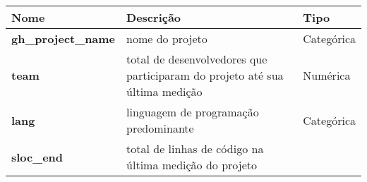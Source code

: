 \documentclass[]{article}
\begin{document}
\begin{longtable}[]{@{}lll@{}}
\toprule
\begin{minipage}[b]{0.21\columnwidth}\raggedright\strut
Nome\strut
\end{minipage} & \begin{minipage}[b]{0.61\columnwidth}\raggedright\strut
Descrição\strut
\end{minipage} & \begin{minipage}[b]{0.10\columnwidth}\raggedright\strut
Tipo\strut
\end{minipage}\tabularnewline
\midrule
\endhead
\begin{minipage}[t]{0.21\columnwidth}\raggedright\strut
\textbf{gh\_project\_name}\strut
\end{minipage} & \begin{minipage}[t]{0.61\columnwidth}\raggedright\strut
nome do projeto\strut
\end{minipage} & \begin{minipage}[t]{0.10\columnwidth}\raggedright\strut
Categórica\strut
\end{minipage}\tabularnewline
\begin{minipage}[t]{0.21\columnwidth}\raggedright\strut
\textbf{team}\strut
\end{minipage} & \begin{minipage}[t]{0.61\columnwidth}\raggedright\strut
total de desenvolvedores que participaram do projeto até sua última
medição\strut
\end{minipage} & \begin{minipage}[t]{0.10\columnwidth}\raggedright\strut
Numérica\strut
\end{minipage}\tabularnewline
\begin{minipage}[t]{0.21\columnwidth}\raggedright\strut
\textbf{lang}\strut
\end{minipage} & \begin{minipage}[t]{0.61\columnwidth}\raggedright\strut
linguagem de programação predominante\strut
\end{minipage} & \begin{minipage}[t]{0.10\columnwidth}\raggedright\strut
Categórica\strut
\end{minipage}\tabularnewline
\begin{minipage}[t]{0.21\columnwidth}\raggedright\strut
\textbf{sloc\_end}\strut
\end{minipage} & \begin{minipage}[t]{0.61\columnwidth}\raggedright\strut
total de linhas de código na última medição do projeto\strut

\end{minipage}
\end{longtable}
\end{document}
